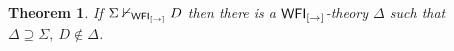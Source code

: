 \documentclass[12pt]{article}
\newtheorem{thm}{Theorem}[section]
\newtheorem{dfn}[thm]{Definition}
\begin{document}
\begin{thm}
\label{2ci}
If $ \Sigma \nvdash_{{\sf WFI_{[\rightarrow]}} } D$ then there is a ${\sf WFI_{[\rightarrow]}}$-theory $ \Delta $ such that $\Delta \supseteq \Sigma, ~D \notin \Delta$.
\end{thm}

\end{document}
